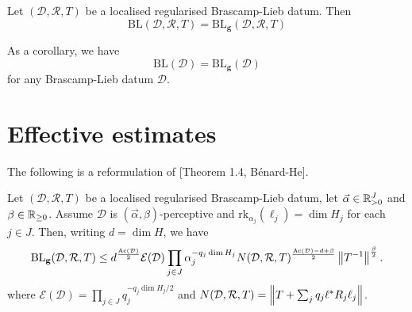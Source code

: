 \begin{theorem} \label{general-Liebthm}
Let $(\mathcal{D},\mathcal{R}, T)$ be a localised regularised Brascamp-Lieb datum.
Then
\begin{equation}\label{gaussian-upp}
\mathrm{BL}(\mathcal{D}, \mathcal{R}, T) = \mathrm{BL}_{\mathbf{g}}(\mathcal{D}, \mathcal{R}, T)
\end{equation}
\end{theorem}
As a corollary, we have
\[
\mathrm{BL}(\mathcal{D}) = \mathrm{BL}_{\mathbf{g}}(\mathcal{D})
\]
for any Brascamp-Lieb datum $\mathcal{D}$.

\section{Effective estimates}


The following is a reformulation of [Theorem 1.4, Bénard-He].
\begin{theorem}
\label{thm:BL_local_regular_upper_bound}
Let $(\mathcal{D},\mathcal{R}, T)$ be a  localised regularised Brascamp-Lieb datum, let  $\vec{\alpha} \in \mathbb{R}_{>0}^J$ and $\beta \in \mathbb{R}_{\geq 0}$. Assume $\mathcal{D}$ is $(\vec{\alpha}, \beta)$-perceptive and  $\mathrm{rk}_{\alpha_j}(\ell_j) = \dim H_j$ for each $j \in J$.
Then, writing $d = \dim H$, we have
\begin{equation}\label{eq:rlub}
\mathrm{BL}_{\mathbf{g}}(\mathcal{D}, \mathcal{R}, T)
\leq d^{\frac{\mathrm{Ac}(\mathcal{D})}{2}}  \mathcal{E}(\mathcal{D}) \prod_{j \in J} \alpha_j^{-q_j \dim H_j} N(\mathcal{D}, \mathcal{R}, T)^{\frac{\mathrm{Ac}(\mathcal{D})-d+\beta}{2}} \left\lVert T^{-1} \right\rVert^{\frac{\beta}{2}}.
\end{equation}
where $\mathcal{E}(\mathcal{D}) = \prod_{j \in J} q_j^{-q_j  \dim H_j / 2}$ and $N(\mathcal{D}, \mathcal{R}, T) =  \left\lVert T + \sum_{j} q_j \ell^* R_j \ell_j \right\rVert$.
\end{theorem}

